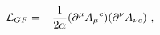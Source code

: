 \begin{equation}
{\cal{L}}_{GF} = - {\frac{1}{2 \alpha}}  (\partial^{\mu} {A_{\mu}}^{c}) (\partial^{\nu} A_{\nu c})~, 
\end{equation}

